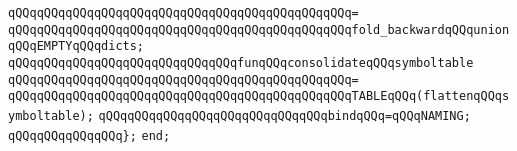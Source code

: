 \verb|qQQqqQQqqQQqqQQqqQQqqQQqqQQqqQQqqQQqqQQqqQQqqQQq=|\newline
\verb|qQQqqQQqqQQqqQQqqQQqqQQqqQQqqQQqqQQqqQQqqQQqqQQqfold_backwardqQQqunionqQQqEMPTYqQQqdicts;|\newline
\newline
\verb|qQQqqQQqqQQqqQQqqQQqqQQqqQQqqQQqfunqQQqconsolidateqQQqsymboltable|\newline
\verb|qQQqqQQqqQQqqQQqqQQqqQQqqQQqqQQqqQQqqQQqqQQqqQQq=|\newline
\verb|qQQqqQQqqQQqqQQqqQQqqQQqqQQqqQQqqQQqqQQqqQQqqQQqTABLEqQQq(flattenqQQqsymboltable);|\newline
\newline
\verb|qQQqqQQqqQQqqQQqqQQqqQQqqQQqqQQqbindqQQq=qQQqNAMING;|\newline
\verb|qQQqqQQqqQQqqQQq};|\newline
\verb|end;|\newline

